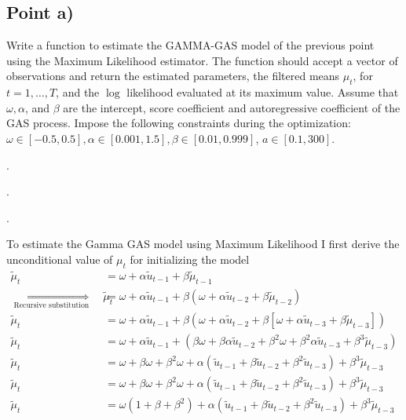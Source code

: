 \documentclass{article}
\begin{document}
\subsection{Point a) }

Write a function to estimate the GAMMA-GAS model of the previous point
using the Maximum Likelihood estimator. The function should accept
a vector of observations and return the estimated parameters, the
filtered means $\mu_{t}$, for $t=1,\ldots,T$, and the $\log$ likelihood
evaluated at its maximum value. Assume that $\omega,\alpha$, and
$\beta$ are the intercept, score coefficient and autoregressive coefficient
of the GAS process. Impose the following constraints during the optimization:
$\omega\in[-0.5,0.5],\alpha\in[0.001,1.5],\beta\in[0.01,0.999]$,
$a\in[0.1,300].$

.

.

.

To estimate the Gamma GAS model using Maximum Likelihood I first derive
the unconditional value of $\mu_{t}$ for initializing the model
\begin{align*}
\widetilde{\mu}_{t} & =\omega+\alpha\widetilde{u}_{t-1}+\beta\widetilde{\mu}_{t-1}\\
\underset{\text{Recursive substitution}}{\Longrightarrow}\quad\widetilde{\mu}_{t} & =\omega+\alpha\widetilde{u}_{t-1}+\beta\left(\omega+\alpha\widetilde{u}_{t-2}+\beta\widetilde{\mu}_{t-2}\right)\\
\widetilde{\mu}_{t} & =\omega+\alpha\widetilde{u}_{t-1}+\beta\left(\omega+\alpha\widetilde{u}_{t-2}+\beta\left[\omega+\alpha\widetilde{u}_{t-3}+\beta\widetilde{\mu}_{t-3}\right]\right)\\
\widetilde{\mu}_{t} & =\omega+\alpha\widetilde{u}_{t-1}+\left(\beta\omega+\beta\alpha\widetilde{u}_{t-2}+\beta^{2}\omega+\beta^{2}\alpha\widetilde{u}_{t-3}+\beta^{3}\widetilde{\mu}_{t-3}\right)\\
\widetilde{\mu}_{t} & =\omega+\beta\omega+\beta^{2}\omega+\alpha\left(\widetilde{u}_{t-1}+\beta\widetilde{u}_{t-2}+\beta^{2}\widetilde{u}_{t-3}\right)+\beta^{3}\widetilde{\mu}_{t-3}\\
\widetilde{\mu}_{t} & =\omega+\beta\omega+\beta^{2}\omega+\alpha\left(\widetilde{u}_{t-1}+\beta\widetilde{u}_{t-2}+\beta^{2}\widetilde{u}_{t-3}\right)+\beta^{3}\widetilde{\mu}_{t-3}\\
\widetilde{\mu}_{t} & =\omega\left(1+\beta+\beta^{2}\right)+\alpha\left(\widetilde{u}_{t-1}+\beta\widetilde{u}_{t-2}+\beta^{2}\widetilde{u}_{t-3}\right)+\beta^{3}\widetilde{\mu}_{t-3}
\end{align*}
\end{document}
